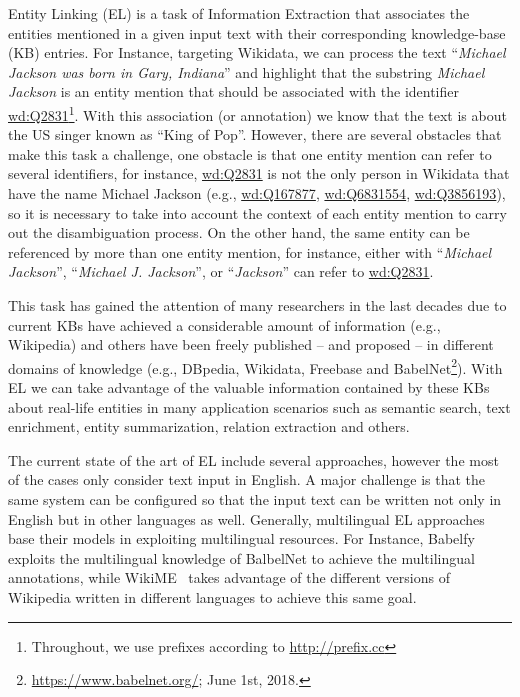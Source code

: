 \documentclass{llncs}
\begin{document}
Entity Linking (EL) is a task of Information Extraction that associates the entities mentioned in a given input text with their corresponding knowledge-base (KB) entries. For Instance, targeting Wikidata, we can process the text ``\textit{Michael Jackson was born in Gary, Indiana}'' and highlight that the substring \textit{Michael Jackson} is an entity mention that should be associated with the identifier \url{wd:Q2831}\footnote{Throughout, we use prefixes according to \url{http://prefix.cc}}. With this association (or annotation) we know that the text is about the US singer known as ``King of Pop''. However, there are several obstacles that make this task a challenge, one obstacle is that one entity mention can refer to several identifiers, for instance, \url{wd:Q2831} is not the only person in Wikidata that have the name Michael Jackson (e.g., \url{wd:Q167877}, \url{wd:Q6831554}, \url{wd:Q3856193}), so it is necessary to take into account the context of each entity mention to carry out the disambiguation process. On the other hand, the same entity can be referenced by more than one entity mention, for instance, either with ``\textit{Michael Jackson}'', ``\textit{Michael J. Jackson}'',  or ``\textit{Jackson}'' can refer to \url{wd:Q2831}. 

This task has gained the attention of many researchers in the last decades  due to current KBs have achieved a considerable amount of information (e.g., Wikipedia) and others have been freely published -- and proposed -- in different domains of knowledge (e.g., DBpedia, Wikidata, Freebase and BabelNet\footnote{\url{https://www.babelnet.org/}; June 1st, 2018.}). With EL we can take advantage of the valuable information contained by these KBs about real-life entities in many application scenarios such as semantic search, text enrichment, entity summarization, relation extraction and others. 

The current state of the art of EL include several approaches, however the most of the cases only consider text input in English. A major challenge is that the same system can be configured so that the input text can be written not only in English but in other languages as well. Generally, multilingual EL approaches base their models in exploiting multilingual resources. For Instance, Babelfy~\cite{Babelfy14}  exploits the multilingual knowledge of BalbelNet to achieve the multilingual annotations, while WikiME~\cite{WikiMe16} takes advantage of the different versions of Wikipedia written in different languages to achieve this same goal. 
\end{document}

